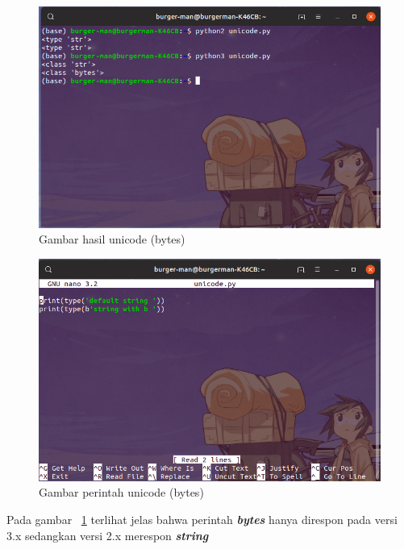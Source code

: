 \begin{enumerate}
\begin{figure}[H]
\centering
\includegraphics[width=1\textwidth]{figures/unicodebytes.png}
\caption{Gambar hasil unicode (bytes)}
\label{unibytes}
\end{figure}

\begin{figure}[H]
\centering
\includegraphics[width=1\textwidth]{figures/unicodebytesnano.png}
\caption{Gambar perintah unicode (bytes)}
\label{unibytesnano}
\end{figure}
Pada gambar ~\ref{unibytes} terlihat jelas bahwa perintah \textbf{\textit{bytes}} hanya direspon pada versi 3.x sedangkan versi 2.x merespon \textbf{\textit{string}}


\end{enumerate}
